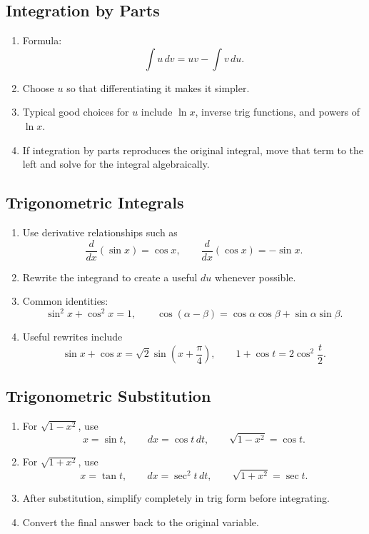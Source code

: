 \documentclass[11pt]{article}
\begin{document}
\subsection{Integration by Parts}
\begin{enumerate}
  \item Formula:
  \[
  \int u\,dv=uv-\int v\,du.
  \]
  \item Choose $u$ so that differentiating it makes it simpler.
  \item Typical good choices for $u$ include $\ln x$, inverse trig functions, and powers of $\ln x$.
  \item If integration by parts reproduces the original integral, move that term to the left and solve for the integral algebraically.
\end{enumerate}

\subsection{Trigonometric Integrals}
\begin{enumerate}
  \item Use derivative relationships such as
  \[
  \frac{d}{dx}(\sin x)=\cos x,\qquad \frac{d}{dx}(\cos x)=-\sin x.
  \]
  \item Rewrite the integrand to create a useful $du$ whenever possible.
  \item Common identities:
  \[
  \sin^2 x+\cos^2 x=1,\qquad
  \cos(\alpha-\beta)=\cos\alpha\cos\beta+\sin\alpha\sin\beta.
  \]
  \item Useful rewrites include
  \[
  \sin x+\cos x=\sqrt{2}\sin\left(x+\frac{\pi}{4}\right),\qquad
  1+\cos t=2\cos^2\frac{t}{2}.
  \]
\end{enumerate}

\subsection{Trigonometric Substitution}
\begin{enumerate}
  \item For $\sqrt{1-x^2}$, use
  \[
  x=\sin t,\qquad dx=\cos t\,dt,\qquad \sqrt{1-x^2}=\cos t.
  \]
  \item For $\sqrt{1+x^2}$, use
  \[
  x=\tan t,\qquad dx=\sec^2 t\,dt,\qquad \sqrt{1+x^2}=\sec t.
  \]
  \item After substitution, simplify completely in trig form before integrating.
  \item Convert the final answer back to the original variable.
\end{enumerate}
\end{document}
